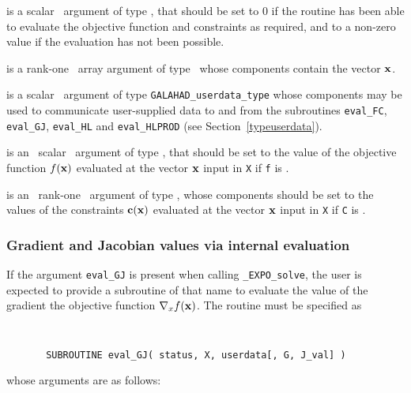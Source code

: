 \documentclass{galahad}
\newcommand{\packagename}{EXPO}
\newcommand{\fullpackagename}{\libraryname\_\packagename}
\newcommand{\solver}{{\tt \fullpackagename\_solve}}
\begin{document}
\begin{description}
 is a scalar \intentout\ argument of type \integer,
that should be set to 0 if the routine has been able to evaluate
the objective function and constraints as required,
and to a non-zero value if the evaluation has not been possible.

 is a rank-one \intentin\ array argument of type \realdp\
whose components contain the vector ${\mathbf{x}}$.

 is a scalar \intentinout\ argument of type
{\tt GALAHAD\_userdata\_type} whose components may be used
to communicate user-supplied data to and from the
subroutines {\tt eval\_FC}, {\tt eval\_GJ},
{\tt eval\_HL} and {\tt eval\_HLPROD}
(see Section~\ref{typeuserdata}).

 is an \optional\ scalar \intentout\ argument of type \realdp,
that should be set to the value of the objective function $f({\mathbf{x}})$
evaluated at the vector ${\mathbf{x}}$ input in {\tt X} if {\tt f} is \present.

 is an \optional\ rank-one \intentout\ argument of type \realdp,
whose components should be set to the values of the constraints
${\mathbf{c}}({\mathbf{x}})$ evaluated at the vector ${\mathbf{x}}$ input in {\tt X} 
if {\tt C} is \present.

\end{description}


\subsubsection{Gradient and Jacobian values via internal evaluation\label{gjfv}}

If the argument {\tt eval\_GJ} is present when calling \solver, the
user is expected to provide a subroutine of that name to evaluate the
value of the gradient the objective function $\nabla_x f({\mathbf{x}})$.
The routine must be specified as

\def\baselinestretch{0.8}
{\tt
\begin{verbatim}
       SUBROUTINE eval_GJ( status, X, userdata[, G, J_val] )
\end{verbatim} }
\def\baselinestretch{1.0}
\noindent whose arguments are as follows:
\end{document}
